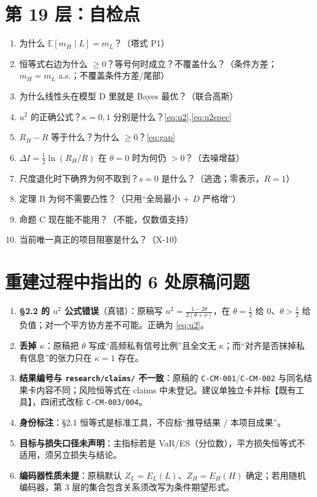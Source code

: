 \documentclass[UTF8,11pt,a4paper]{ctexart}
\newcommand{\E}{\mathbb{E}}
\begin{document}
\section{第 19 层：自检点}

\begin{enumerate}
  \item 为什么 $\E[m_H\mid L]=m_L$？（塔式 P1）
  \item 恒等式右边为什么 $\ge0$？等号何时成立？不覆盖什么？（条件方差；$m_H=m_L$ a.s.；不覆盖条件方差/尾部）
  \item 为什么线性头在模型 D 里就是 Bayes 最优？（联合高斯）
  \item $u^2$ 的正确公式？$\kappa=0,1$ 分别是什么？\eqref{eq:u2},\eqref{eq:u2spec}
  \item $R_H-R$ 等于什么？为什么 $\ge0$？\eqref{eq:gap}
  \item $\Delta I=\frac12\ln(R_H/R)$ 在 $\theta=0$ 时为何仍 $>0$？（去噪增益）
  \item 尺度退化时下确界为何不取到？$s=0$ 是什么？（逃逸；零表示，$R=1$）
  \item 定理 B 为何不需要凸性？（只用``全局最小 $+$ $D$ 严格增''）
  \item 命题 C 现在能不能用？（不能，仅数值支持）
  \item 当前唯一真正的项目阻塞是什么？（X-10）
\end{enumerate}

\section{重建过程中指出的 6 处原稿问题}

\begin{enumerate}
  \item \textbf{\S2.2 的 $u^2$ 公式错误}（真错）：原稿写 $u^2=\frac{1-2\theta}{2(\theta+\nu)}$，在 $\theta=\frac12$ 给 $0$、$\theta>\frac12$ 给负值；对一个平方协方差不可能。正确为 \eqref{eq:u2}。
  \item \textbf{丢掉 $\kappa$}：原稿把 $\theta$ 写成``高频私有信号比例''且全文无 $\kappa$；而``对齐是否抹掉私有信息''的张力只在 $\kappa=1$ 存在。
  \item \textbf{结果编号与 \texttt{research/claims/} 不一致}：原稿的 \texttt{C-CM-001}/\texttt{C-CM-002} 与同名结果卡内容不同；风险恒等式在 claims 中未登记。建议单独立卡并标【既有工具】，四闭式改标 \texttt{C-CM-003/004}。
  \item \textbf{身份标注}：\S2.1 恒等式是标准工具，不应标``推导结果 / 本项目成果''。
  \item \textbf{目标与损失口径未声明}：主指标若是 VaR/ES（分位数），平方损失恒等式不适用，须另立损失与结论。
  \item \textbf{编码器性质未提}：原稿默认 $Z_L=E_L(L)$、$Z_H=E_H(H)$ 确定；若用随机编码器，第 3 层的集合包含关系须改写为条件期望形式。
\end{enumerate}
\end{document}
